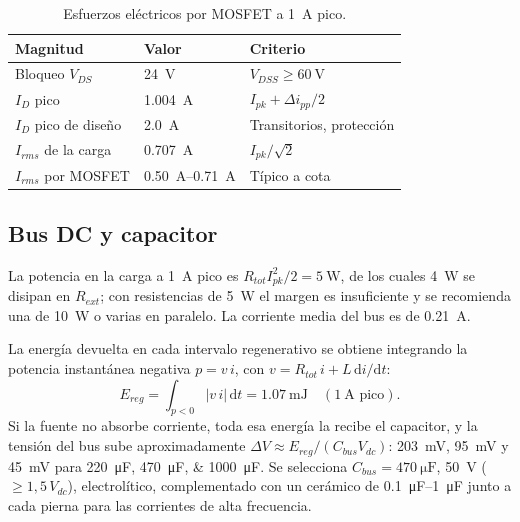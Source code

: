\documentclass[10pt,twocolumn,letterpaper]{article}
\begin{document}
\begin{table}[!t]
\centering
\caption{Esfuerzos eléctricos por MOSFET a \SI{1}{\ampere} pico.}
\label{tab:esfuerzos}
\footnotesize
\begin{tabular}{@{}lll@{}}
\toprule
Magnitud & Valor & Criterio \\
\midrule
Bloqueo $V_{DS}$ & \SI{24}{\volt} & $V_{DSS}\ge\SI{60}{\volt}$ \\
$I_{D}$ pico & \SI{1,004}{\ampere} & $I_{pk}+\Delta i_{pp}/2$ \\
$I_{D}$ pico de diseño & \SI{2,0}{\ampere} & Transitorios, protección \\
$I_{rms}$ de la carga & \SI{0,707}{\ampere} & $I_{pk}/\sqrt2$ \\
$I_{rms}$ por MOSFET & \SIrange{0,50}{0,71}{\ampere} & Típico a cota \\
\bottomrule
\end{tabular}
\end{table}

\subsection{Bus DC y capacitor}\label{sec:bus}
La potencia en la carga a \SI{1}{\ampere} pico es $R_{tot}I_{pk}^2/2=\SI{5}{\watt}$, de los cuales \SI{4}{\watt} se disipan en $R_{ext}$; con resistencias de \SI{5}{\watt} el margen es insuficiente y se recomienda una de \SI{10}{\watt} o varias en paralelo. La corriente media del bus es de \SI{0,21}{\ampere}.

La energía devuelta en cada intervalo regenerativo se obtiene integrando la potencia instantánea negativa $p=v\,i$, con $v=R_{tot}\,i+L\,\mathrm{d}i/\mathrm{d}t$:
\begin{equation}
E_{reg}=\int_{p<0}|v\,i|\,\mathrm{d}t=\SI{1,07}{\milli\joule}\quad(\SI{1}{\ampere}\text{ pico}).
\end{equation}
Si la fuente no absorbe corriente, toda esa energía la recibe el capacitor, y la tensión del bus sube aproximadamente $\Delta V\approx E_{reg}/(C_{bus}V_{dc})$: \SI{203}{\milli\volt}, \SI{95}{\milli\volt} y \SI{45}{\milli\volt} para \SIlist{220;470;1000}{\micro\farad}. Se selecciona $C_{bus}=\SI{470}{\micro\farad}$, \SI{50}{\volt} ($\ge 1{,}5\,V_{dc}$), electrolítico, complementado con un cerámico de \SIrange{0,1}{1}{\micro\farad} junto a cada pierna para las corrientes de alta frecuencia.

\end{document}
